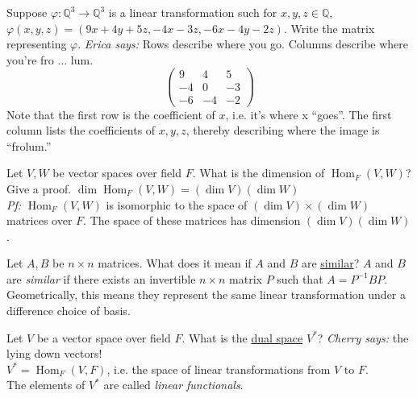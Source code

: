 \documentclass[avery5371,grid]{flashcards}
\newcommand{\Q}{\mathbb{Q}}
\newcommand{\inv}{^{-1}}
\DeclareMathOperator{\Hom}{Hom}
\let \phi \varphi
\begin{document}
\begin{flashcard}{Suppose $\phi: \Q^3 \to \Q^3$ is a linear transformation such for $x,y,z \in \Q$, $\phi(x,y,z) = (9x+4y+5z, -4x-3z, -6x-4y-2z)$. Write the matrix representing $\phi$.}
 \emph{Erica says: } Rows describe where you go. Columns describe where you're fro $\ldots$ lum.
 $$
 \left ( \begin{array}{ccc}
      9 & 4 & 5 \\
      -4 & 0 & -3 \\
      -6 & -4 & -2
 \end{array} \right )
$$
Note that the first row is the coefficient of $x$, i.e. it's where x ``goes''. The first column lists the coefficients of $x,y,z$, thereby describing where the image is ``frolum.''
\end{flashcard}

\begin{flashcard}{Let $V,W$ be vector spaces over field $F$. What is the dimension of $\Hom_F(V,W)$? Give a proof.}
 $\dim \Hom_F(V,W) = (\dim V)(\dim W)$\\
 
 \emph{Pf: }$\Hom_F(V,W)$ is isomorphic to the space of $(\dim V) \times (\dim W)$ matrices over $F$. The space of these matrices has dimension $(\dim V)(\dim W)$.
\end{flashcard}

\begin{flashcard}{Let $A,B$ be $n \times n$ matrices. What does it mean if $A$ and $B$ are \underline{similar}?}
 $A$ and $B$ are \emph{similar} if there exists an invertible $n \times n$ matrix $P$ such that $A = P \inv B P$.\\
 
 Geometrically, this means they represent the same linear transformation under a difference choice of basis.
\end{flashcard}

\begin{flashcard}{Let $V$ be a vector space over field $F$. What is the \underline{dual space} $V^*$?}
 \emph{Cherry says: } the lying down vectors!\\
 
 $V^* = \Hom_F(V,F)$, i.e. the space of linear transformations from $V$ to $F$.\\
 
 The elements of $V^*$ are called \emph{linear functionals}.
\end{flashcard}
\end{document}

